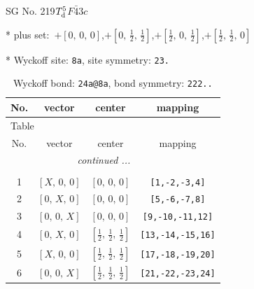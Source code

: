 \documentclass[fleqn,8pt]{jsarticle}
\begin{document}
\setcounter{MaxMatrixCols}{32}

\renewcommand{\tablename}{Table~}
\renewcommand{\figurename}{Figure~}
\begin{center}
\LARGE
SG No. 219\quad$T_{\rm d}^{5}$\quad$F\bar{4}3c$\quad[ cubic ]
\end{center}

* plus set:\,\,\,$+\left[ 0,\, 0,\, 0 \right]$,\quad $+\left[ 0,\, \frac{1}{2},\, \frac{1}{2} \right]$,\quad $+\left[ \frac{1}{2},\, 0,\, \frac{1}{2} \right]$,\quad $+\left[ \frac{1}{2},\, \frac{1}{2},\, 0 \right]$


* Wyckoff site: {\tt 8a}, site symmetry: {\tt 23.}
\renewcommand{\arraystretch}{1.2}
\begin{longtable}{cccc}
\caption{Wyckoff bond: {\tt 24a@8a}, bond symmetry: {\tt 222..}}
 \\
 \hline \hline
No. & vector & center & mapping \\ \hline \endfirsthead

\multicolumn{3}{l}{\tablename\ \thetable{}} \\
 \hline \hline
No. & vector & center & mapping \\ \hline \endhead

 \hline \hline
\multicolumn{3}{r}{\footnotesize\it continued ...} \\ \endfoot

 \hline \hline
\multicolumn{3}{r}{} \\ \endlastfoot

1 & $\left[ X,\, 0,\, 0 \right]$ & $\left[ 0,\, 0,\, 0 \right]$ & {\tt [1,-2,-3,4]} \\ \hline
2 & $\left[ 0,\, X,\, 0 \right]$ & $\left[ 0,\, 0,\, 0 \right]$ & {\tt [5,-6,-7,8]} \\ \hline
3 & $\left[ 0,\, 0,\, X \right]$ & $\left[ 0,\, 0,\, 0 \right]$ & {\tt [9,-10,-11,12]} \\ \hline
4 & $\left[ 0,\, X,\, 0 \right]$ & $\left[ \frac{1}{2},\, \frac{1}{2},\, \frac{1}{2} \right]$ & {\tt [13,-14,-15,16]} \\ \hline
5 & $\left[ X,\, 0,\, 0 \right]$ & $\left[ \frac{1}{2},\, \frac{1}{2},\, \frac{1}{2} \right]$ & {\tt [17,-18,-19,20]} \\ \hline
6 & $\left[ 0,\, 0,\, X \right]$ & $\left[ \frac{1}{2},\, \frac{1}{2},\, \frac{1}{2} \right]$ & {\tt [21,-22,-23,24]} \\
\end{longtable}
\renewcommand{\arraystretch}{1.2}
\end{document}
